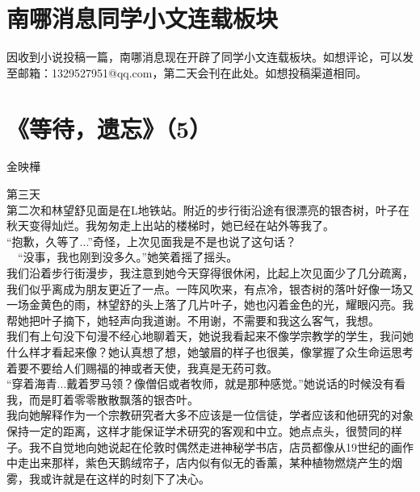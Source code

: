 \documentclass[letterpaper, 12pt]{article}
\begin{document}
\begin{multicols}{2}
\section{南哪消息同学小文连载板块}
因收到小说投稿一篇，南哪消息现在开辟了同学小文连载板块。如想评论，可以发至邮箱：1329527951@qq.com，第二天会刊在此处。如想投稿渠道相同。
\section{《等待，遗忘》（5）}
金映樺\\

\newCJKfontfamily{}\fan

第三天\\

  第二次和林望舒见面是在L地铁站。附近的步行街沿途有很漂亮的银杏树，叶子在秋天变得灿烂。我匆匆走上出站的楼梯时，她已经在站外等我了。\\
  
  “抱歉，久等了...”奇怪，上次见面我是不是也说了这句话？\\
  
　“没事，我也刚到没多久。”她笑着摇了摇头。\\
 
  我们沿着步行街漫步，我注意到她今天穿得很休闲，比起上次见面少了几分疏离，我们似乎离成为朋友更近了一点。一阵风吹来，有点冷，银杏树的落叶好像一场又一场金黄色的雨，林望舒的头上落了几片叶子，她也闪着金色的光，耀眼闪亮。我帮她把叶子摘下，她轻声向我道谢。不用谢，不需要和我这么客气，我想。\\
  
  我们有上句没下句漫不经心地聊着天，她说我看起来不像学宗教学的学生，我问她什么样才看起来像？她认真想了想，她皱眉的样子也很美，像掌握了众生命运思考着要不要给人们赐福的神或者天使，我真是无药可救。\\
  
“穿着海青...戴着罗马领？像僧侣或者牧师，就是那种感觉。”她说话的时候没有看我，而是盯着零零散散飘落的银杏叶。\\

  我向她解释作为一个宗教研究者大多不应该是一位信徒，学者应该和他研究的对象保持一定的距离，这样才能保证学术研究的客观和中立。她点点头，很赞同的样子。我不自觉地向她说起在伦敦时偶然走进神秘学书店，店员都像从19世纪的画作中走出来那样，紫色天鹅绒帘子，店内似有似无的香薰，某种植物燃烧产生的烟雾，我或许就是在这样的时刻下了决心。\\
  

\end{multicols}
\end{document}
